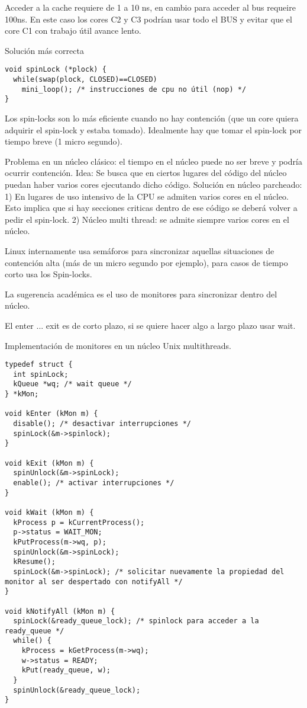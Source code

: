 Acceder a la cache requiere de 1 a 10 ns, en cambio para acceder al bus requeire 100ns. En este caso los cores C2 y C3 podrían usar todo el BUS y evitar que el core C1 con trabajo útil avance lento.

Solución más correcta
\begin{verbatim}
void spinLock (*plock) {
  while(swap(plock, CLOSED)==CLOSED)
    mini_loop(); /* instrucciones de cpu no útil (nop) */
}
\end{verbatim}

Los spin-locks son lo más eficiente cuando no hay contención (que un core quiera adquirir el spin-lock y estaba tomado). Idealmente hay que tomar  el spin-lock por tiempo breve (1 micro segundo).

Problema en un núcleo clásico: el tiempo en el núcleo puede no ser breve y podría ocurrir contención.
Idea: Se busca que en ciertos lugares del código del núcleo puedan haber varios cores ejecutando dicho código.
Solución en núcleo parcheado:
1) En lugares de uso intensivo de la CPU se admiten varios cores en el núcleo. Esto implica que si hay secciones criticas dentro de ese código se deberá volver a pedir el spin-lock.
2) Núcleo multi thread: se admite siempre varios cores en el núcleo.

Linux internamente usa semáforos para sincronizar aquellas situaciones de contención alta (más de un micro segundo por ejemplo), para casos de tiempo corto usa los Spin-locks.

La sugerencia académica es el uso de monitores para sincronizar dentro del núcleo.

El enter ... exit es de corto plazo, si se quiere hacer algo a largo plazo usar wait.

Implementación de monitores en un núcleo Unix multithreads.

\begin{verbatim}
typedef struct {
  int spinLock;
  kQueue *wq; /* wait queue */
} *kMon;

void kEnter (kMon m) {
  disable(); /* desactivar interrupciones */  
  spinLock(&m->spinlock);
}

void kExit (kMon m) {
  spinUnlock(&m->spinLock);
  enable(); /* activar interrupciones */
}

void kWait (kMon m) {
  kProcess p = kCurrentProcess();
  p->status = WAIT_MON;
  kPutProcess(m->wq, p);
  spinUnlock(&m->spinLock);
  kResume();
  spinLock(&m->spinLock); /* solicitar nuevamente la propiedad del monitor al ser despertado con notifyAll */
}

void kNotifyAll (kMon m) {
  spinLock(&ready_queue_lock); /* spinlock para acceder a la ready_queue */
  while() {
    kProcess = kGetProcess(m->wq);
    w->status = READY;
    kPut(ready_queue, w);
  }
  spinUnlock(&ready_queue_lock);
}
\end{verbatim}

